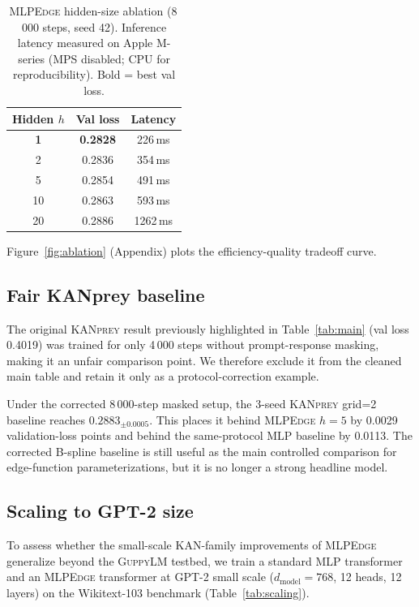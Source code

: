 \documentclass{article}
\newcommand{\mlpedge}{\textsc{MLPEdge}}
\newcommand{\kanprey}{\textsc{KANprey}}
\newcommand{\guppylm}{\textsc{GuppyLM}}
\begin{document}
\begin{table}[h]
\centering
\caption{%
  \mlpedge{} hidden-size ablation (8\,000 steps, seed 42).
  Inference latency measured on Apple M-series (MPS disabled; CPU for
  reproducibility). Bold = best val loss.
}
\label{tab:ablation}
\begin{tabular}{ccc}
\toprule
Hidden $h$ & Val loss & Latency \\
\midrule
\textbf{1}  & \textbf{0.2828} & 226\,ms \\
2  & 0.2836 & 354\,ms \\
5  & 0.2854 & 491\,ms \\
10 & 0.2863 & 593\,ms \\
20 & 0.2886 & 1262\,ms \\
\bottomrule
\end{tabular}
\end{table}

Figure~\ref{fig:ablation} (Appendix) plots the efficiency-quality tradeoff curve.

\subsection{Fair KANprey baseline}
\label{sec:kan_retrain}

The original \kanprey{} result previously highlighted in Table~\ref{tab:main}
(val loss 0.4019) was trained for only 4\,000 steps without prompt-response
masking, making it an unfair comparison point.
We therefore exclude it from the cleaned main table and retain it only as a
protocol-correction example.

Under the corrected 8\,000-step masked setup, the 3-seed \kanprey{} grid=2
baseline reaches $0.2883_{\pm 0.0005}$.
This places it behind \mlpedge{} $h=5$ by 0.0029 validation-loss points and
behind the same-protocol MLP baseline by 0.0113.
The corrected B-spline baseline is still useful as the main controlled
comparison for edge-function parameterizations, but it is no longer a strong
headline model.

\subsection{Scaling to GPT-2 size}
\label{sec:scaling}

To assess whether the small-scale KAN-family improvements of \mlpedge{}
generalize beyond the \guppylm{} testbed, we train a standard MLP transformer
and an \mlpedge{} transformer at GPT-2 small scale
($d_\text{model}=768$, 12 heads, 12 layers) on the Wikitext-103 benchmark
(Table~\ref{tab:scaling}).
\end{document}
